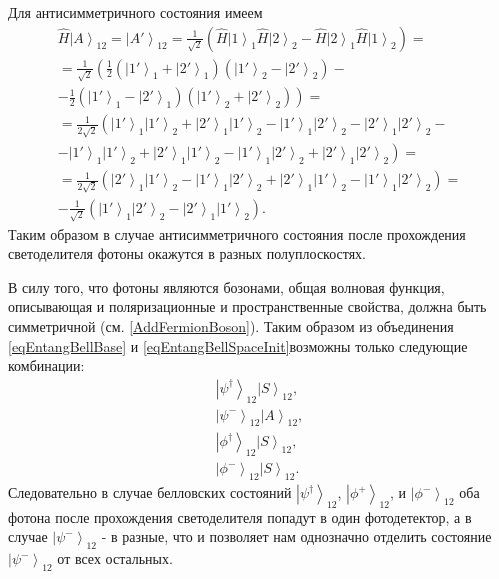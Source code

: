 Для антисимметричного состояния имеем
\begin{eqnarray}
\hat{H}\left|A\right>_{12} = \left|A'\right>_{12} = 
\frac{1}{\sqrt{2}}
\left(
\hat{H}\left|1\right>_1\hat{H}\left|2\right>_2 -
\hat{H}\left|2\right>_1\hat{H}\left|1\right>_2
\right) = 
\nonumber \\
=
\frac{1}{\sqrt{2}}
\left(
\frac{1}{2}
\left(\left|1'\right>_1 +
\left|2'\right>_1\right)
\left(\left|1'\right>_2 -
\left|2'\right>_2\right) -
\right.
\nonumber \\
- \left.
\frac{1}{2}
\left(\left|1'\right>_1 -
\left|2'\right>_1\right)
\left(\left|1'\right>_2 +
\left|2'\right>_2\right)
\right) = 
\nonumber \\
=
\frac{1}{2 \sqrt{2}}
\left(
\left|1'\right>_1 \left|1'\right>_2 +
\left|2'\right>_1 \left|1'\right>_2 -
\left|1'\right>_1 \left|2'\right>_2 -
\left|2'\right>_1 \left|2'\right>_2 -
\right. 
\nonumber \\
- \left.
\left|1'\right>_1 \left|1'\right>_2 +
\left|2'\right>_1 \left|1'\right>_2 -
\left|1'\right>_1 \left|2'\right>_2 +
\left|2'\right>_1 \left|2'\right>_2
\right) =
\nonumber \\
=
\frac{1}{2 \sqrt{2}}
\left(
\left|2'\right>_1 \left|1'\right>_2 
- \left|1'\right>_1 \left|2'\right>_2 
+ \left|2'\right>_1 \left|1'\right>_2 
- \left|1'\right>_1 \left|2'\right>_2
\right) = 
\nonumber \\
- \frac{1}{\sqrt{2}}
\left(
\left|1'\right>_1 \left|2'\right>_2 
- \left|2'\right>_1 \left|1'\right>_2 
\right).
\nonumber
\end{eqnarray}
Таким образом в случае антисимметричного состояния после прохождения
светоделителя фотоны окажутся в разных полуплоскостях.

В силу того, что фотоны являются бозонами, 
общая волновая функция,
описывающая и поляризационные и пространственные свойства,
должна быть симметричной \cite{bFeinman}
(см. \autoref{AddFermionBoson}). Таким образом из объединения 
\eqref{eqEntangBellBase} и \eqref{eqEntangBellSpaceInit}возможны
только следующие комбинации:
\begin{eqnarray}
\left|\psi^{\dag}\right>_{12}\left|S\right>_{12},
\nonumber \\ 
\left|\psi^{-}\right>_{12}\left|A\right>_{12}, 
\nonumber \\ 
\left|\phi^{\dag}\right>_{12}\left|S\right>_{12}, 
\nonumber \\ 
\left|\phi^{-}\right>_{12}\left|S\right>_{12}.
\nonumber
\end{eqnarray}
Следовательно в случае белловских состояний 
$\left|\psi^{\dag}\right>_{12}$, $\left|\phi^{+}\right>_{12}$, и
$\left|\phi^{-}\right>_{12}$ оба фотона после прохождения
светоделителя попадут в один фотодетектор, а в случае
$\left|\psi^{-}\right>_{12}$ - в разные, что и позволяет нам
однозначно отделить состояние $\left|\psi^{-}\right>_{12}$ от всех
остальных. 

